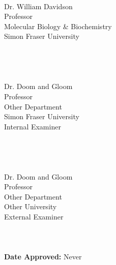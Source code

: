 \makebox[2.5in]{\hrulefill} \hspace {1.0in}\\
Dr. William Davidson\\
Professor\\
Molecular Biology \& Biochemistry\\
Simon Fraser University
\\ \\ \\ \\
\makebox[2.5in]{\hrulefill} \hspace {1.0in} \\
Dr. Doom and Gloom\\
Professor\\
Other Department\\
Simon Fraser University\\
Internal Examiner
\\ \\ \\ \\
\makebox[2.5in]{\hrulefill} \hspace {1.0in}\\
Dr. Doom and Gloom\\
Professor\\
Other Department\\
Other University\\
External Examiner
\\ \\ \\ \\
\textbf{Date Approved:} Never

%


